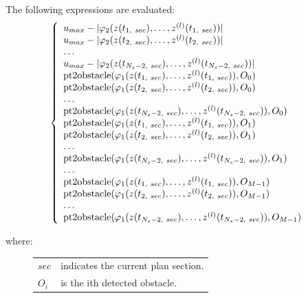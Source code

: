 \documentclass[letterpaper,10pt,english]{sphinxmanual}
\begin{document}
\begin{fulllineitems}
\begin{fulllineitems}
The following expressions are evaluated:
\begin{gather}
\begin{split}\left\lbrace\begin{array}{lcl}
u_{max} - |\varphi_2(z(t_{1,\ sec}),\dotsc,z^{(l)}(t_{1,\ sec}))|\\
u_{max} - |\varphi_2(z(t_{2,\ sec}),\dotsc,z^{(l)}(t_{2,\ sec}))|\\
\dotsc\\
u_{max} - |\varphi_2(z(t_{N_s-2,\ sec}),\dotsc,z^{(l)}(t_{N_s-2,\ sec}))|\\
\mathrm{pt2obstacle}(\varphi_1(z(t_{1,\ sec}),\dotsc,z^{(l)}(t_{1,\ sec})), O_0)\\
\mathrm{pt2obstacle}(\varphi_1(z(t_{2,\ sec}),\dotsc,z^{(l)}(t_{2,\ sec})), O_0)\\
\dotsc\\
\mathrm{pt2obstacle}(\varphi_1(z(t_{N_s-2,\ sec}),
\dotsc,z^{(l)}(t_{N_s-2,\ sec})), O_0)\\
\mathrm{pt2obstacle}(\varphi_1(z(t_{1,\ sec}),\dotsc,z^{(l)}(t_{1,\ sec})), O_1)\\
\mathrm{pt2obstacle}(\varphi_1(z(t_{2,\ sec}),\dotsc,z^{(l)}(t_{2,\ sec})), O_1)\\
\dotsc\\
\mathrm{pt2obstacle}(\varphi_1(z(t_{N_s-2,\ sec}),
\dotsc,z^{(l)}(t_{N_s-2,\ sec})), O_1)\\
\dotsc\\
\mathrm{pt2obstacle}(\varphi_1(z(t_{1,\ sec}),
\dotsc,z^{(l)}(t_{1,\ sec})), O_{M-1})\\
\mathrm{pt2obstacle}(\varphi_1(z(t_{2,\ sec}),
\dotsc,z^{(l)}(t_{2,\ sec})), O_{M-1})\\
\dotsc\\
\mathrm{pt2obstacle}(\varphi_1(z(t_{N_s-2,\ sec}),
\dotsc,z^{(l)}(t_{N_s-2,\ sec})), O_{M-1})\\
\end{array}\right.\end{split}\notag
\end{gather}\begin{description}
\item[{where:}] \leavevmode
\begin{tabulary}{\linewidth}{|L|L|}
\hline

\(sec\)
 & 
indicates the current plan section.
\\

\(O_i\)
 & 
is the ith detected obstacle.
\\


\end{tabulary}
\end{description}
\end{fulllineitems}
\end{fulllineitems}
\end{document}

